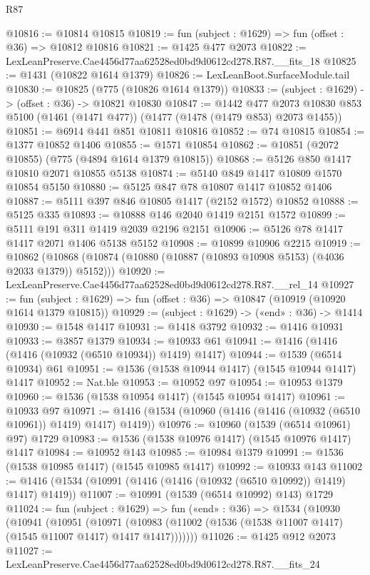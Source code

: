 \begin{lexlean}{R87}
\begin{coremodule}
{{@10816 := @10814 @10815
@10819 := fun (subject : @1629) => fun (offset : @36) => @10812 @10816
@10821 := @1425 @477 @2073
@10822 := LexLeanPreserve.Cae4456d77aa62528ed0bd9d0612cd278.R87.__fits_18
@10825 := @1431 (@10822 @1614 @1379)
@10826 := LexLeanBoot.SurfaceModule.tail
@10830 := @10825 (@775 (@10826 @1614 @1379))
@10833 := (subject : @1629) -> (offset : @36) -> @10821 @10830
@10847 := @1442
    @477
    @2073
    @10830
    @853
    @5100
    (@1461 (@1471 @477))
    (@1477 (@1478 (@1479 @853) @2073 @1455))
@10851 := @6914 @441 @851 @10811 @10816
@10852 := @74 @10815
@10854 := @1377 @10852 @1406
@10855 := @1571 @10854
@10862 := @10851 (@2072 @10855) (@775 (@4894 @1614 @1379 @10815))
@10868 := @5126 @850 @1417 @10810 @2071 @10855 @5138
@10874 := @5140 @849 @1417 @10809 @1570 @10854 @5150
@10880 := @5125 @847 @78 @10807 @1417 @10852 @1406
@10887 := @5111 @397 @846 @10805 @1417 (@2152 @1572) @10852
@10888 := @5125 @335
@10893 := @10888 @146 @2040 @1419 @2151 @1572
@10899 := @5111 @191 @311 @1419 @2039 @2196 @2151
@10906 := @5126 @78 @1417 @1417 @2071 @1406 @5138 @5152
@10908 := @10899 @10906 @2215
@10919 := @10862 (@10868 (@10874 (@10880 (@10887 (@10893 @10908 @5153) (@4036 @2033 @1379)) @5152)))
@10920 := LexLeanPreserve.Cae4456d77aa62528ed0bd9d0612cd278.R87.__rel_14
@10927 := fun (subject : @1629) => fun (offset : @36) => @10847 (@10919 (@10920 @1614 @1379 @10815))
@10929 := (subject : @1629) -> («end» : @36) -> @1414
@10930 := @1548 @1417
@10931 := @1418 @3792
@10932 := @1416 @10931
@10933 := @3857 @1379
@10934 := @10933 @61
@10941 := @1416 (@1416 (@1416 (@10932 (@6510 @10934)) @1419) @1417)
@10944 := @1539 (@6514 @10934) @61
@10951 := @1536 (@1538 @10944 @1417) (@1545 @10944 @1417) @1417
@10952 := Nat.ble
@10953 := @10952 @97
@10954 := @10953 @1379
@10960 := @1536 (@1538 @10954 @1417) (@1545 @10954 @1417)
@10961 := @10933 @97
@10971 := @1416 (@1534 (@10960 (@1416 (@1416 (@10932 (@6510 @10961)) @1419) @1417) @1419))
@10976 := @10960 (@1539 (@6514 @10961) @97) @1729
@10983 := @1536 (@1538 @10976 @1417) (@1545 @10976 @1417) @1417
@10984 := @10952 @143
@10985 := @10984 @1379
@10991 := @1536 (@1538 @10985 @1417) (@1545 @10985 @1417)
@10992 := @10933 @143
@11002 := @1416 (@1534 (@10991 (@1416 (@1416 (@10932 (@6510 @10992)) @1419) @1417) @1419))
@11007 := @10991 (@1539 (@6514 @10992) @143) @1729
@11024 := fun (subject : @1629) =>
  fun («end» : @36) =>
  @1534
    (@10930
      (@10941
        (@10951
          (@10971
            (@10983 (@11002 (@1536 (@1538 @11007 @1417) (@1545 @11007 @1417) @1417 @1417)))))))
@11026 := @1425 @912 @2073
@11027 := LexLeanPreserve.Cae4456d77aa62528ed0bd9d0612cd278.R87.__fits_24
}}
\end{coremodule}
\end{lexlean}
